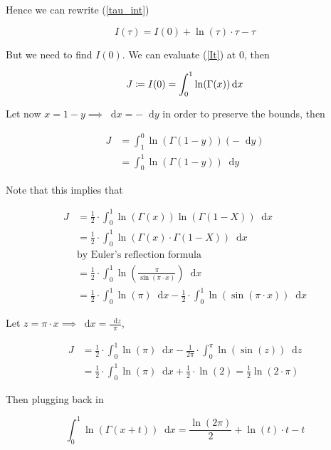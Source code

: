 \documentclass{article}
\newcommand*\diff{\mathop{}\!\mathrm{d}}
\begin{document}
Hence we can rewrite (\ref{tau_int})

\begin{equation}
    I(\tau) = I(0) + \ln(\tau) \cdot \tau - \tau
\end{equation}

But we need to find $I(0)$. We can evaluate (\ref{It}) at 0, then

\begin{equation}
    J \coloneqq I(0) = \int^1_0 \ln(\Gamma(x)) \diff x \\
\end{equation}

Let now $x= 1-y \implies \diff x = -\diff y$ in order to preserve the bounds, then

\begin{equation}
    \begin{split}
        J &= \int^0_1 \ln(\Gamma(1 - y)) (-\diff y) \\
        &=\int^1_0\ln(\Gamma(1 - y)) \diff y
    \end{split}
\end{equation}

Note that this implies that

\begin{equation}
    \begin{split}
        J &= \frac{1}{2} \cdot \int^1_0 \ln(\Gamma(x)) \ln(\Gamma(1 - X)) \diff x \\
        &= \frac{1}{2} \cdot \int^1_0 \ln(\Gamma(x) \cdot \Gamma(1 - X)) \diff x\\
        &\text{by Euler's reflection formula}\\
        &= \frac{1}{2} \cdot \int^1_0 \ln\left( \frac{\pi}{\sin{(\pi \cdot x)}} \right) \diff x \\
        &= \frac{1}{2} \cdot \int^1_0 \ln(\pi) \diff x - \frac{1}{2} \cdot \int^1_0 \ln(\sin{(\pi \cdot x)}) \diff x 
    \end{split}
\end{equation}

Let $z = \pi \cdot x \implies \diff x = \frac{\diff z}{\pi}$,

\begin{equation}
    \begin{split}
        J &= \frac{1}{2} \cdot \int^1_0 \ln(\pi) \diff x - \frac{1}{2 \pi} \cdot \int^\pi_0 \ln(\sin{(z)}) \diff z \\
        &= \frac{1}{2} \cdot \int^1_0 \ln(\pi) \diff x + \frac{1}{2} \cdot \ln(2) = \frac{1}{2} \ln(2 \cdot \pi)
    \end{split}
\end{equation}

Then plugging back in

\begin{equation}
    \int^1_0 \ln\left(\Gamma(x + t)\right) \diff x = \frac{\ln(2\pi)}{2} + \ln(t) \cdot t -t 
\end{equation}
\end{document}
